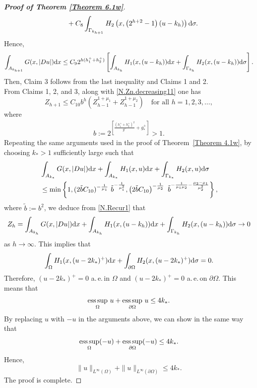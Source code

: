 \documentclass[10pt,reqno]{amsart}
\newcommand *\w{^\wedge}
\theoremstyle{definition}
\numberwithin{equation}{section}
\begin{document}
\begin{proof}[\textbf{Proof of Theorem \ref{Theorem 6.1w}}]
\begin{align*}
		&\qquad +C_8\int_{\Gamma_{k_{h+1}}}H_2\left(x,\left(2^{h+2}-1\right)(u-k_{h})\right){\rm d} \sigma.
	\end{align*}
	Hence,
	\begin{equation*}
		\int_{A_{k_{h+1}}}G(x,|D u|){\rm d}x
		\leq C_92^{h(h_1^++h_2^+)}\left[\int_{A_{k_{h}}}H_1(x,(u-k_{h})){\rm d}x+\int_{\Gamma_{k_h}}H_2(x,(u-k_{h}) ){\rm d}\sigma\right].
	\end{equation*}
	Then, Claim 3 follows from the last inequality and Claims 1 and 2.\\
	From Claims 1, 2, and 3, along with \eqref{N.Zn.decreasing11} one has
	\begin{equation}\label{N.Recur1}
		Z_{h+1}\leq C_{10} b^h\left(Z_{h-1}^{1+\mu_1}+Z_{h-1}^{1+\mu_2}\right)\quad \text{for all } h=1,2,3,\ldots,
	\end{equation}
	where
	\begin{align*}
		b:=2^{\left[\frac{\left(h_1^++h_2^+\right)^2}{g^-}+g_*^+\right]}>1.
	\end{align*}
	Repeating the same arguments used in the proof of Theorem~\ref{Theorem 4.1w}, by choosing \( k_* > 1 \) sufficiently large such that
	\begin{align*}
		&\int_{A_{k_*}}G(x,|D u|){\rm d}x+\int_{A_{k_*} }H_1(x,u){\rm d}x+\int_{\Gamma_{k_*} }H_2(x,u){\rm d} \sigma\\
		&\leq \min\left\{1,(2\tilde{b}C_{10})^{-\frac{1}{\mu_1}}\ \tilde{b}^{-\frac{1}{\mu_1^{2}}},\left(2\tilde{b}C_{10}\right)^{-\frac{1}{\mu_2}}\ \tilde{b}^{-\frac{1}{\mu_1\mu_2}-\frac{\mu_2-\mu_1}{\mu_2^{2}}}\right\},
	\end{align*}
	where $\tilde{b}:=b^2$, we deduce from \eqref{N.Recur1} that
	\begin{align*}
		Z_h=\int_{A_{k_{h}}}G(x,|D u|){\rm d}x+\int_{A_{k_{h}} }H_1(x,(u-k_{h})){\rm d}x+\int_{\Gamma_{k_{h}} }H_2(x,(u-k_{h})){\rm d} \sigma\to 0
	\end{align*}
	as $h\to \infty$. This implies that
	\begin{align*}
		\int_{\Omega}H_1(x,(u-2k_*)^+) {\rm d}x+\int_{\partial\Omega}H_2(x,(u-2k_*)^+) {\rm d} \sigma=0.
	\end{align*}
	Therefore, $(u-2k_*)^{+}=0$ a.\,e.\,in $\Omega$ and $(u-2k_*)^{+}=0$ a.\,e.\,on $\partial\Omega$. This means that
	\begin{align*}
		\underset{\Omega}{\mathop{\rm ess\,sup}}\ u +\underset{\partial\Omega}{\mathop{\rm ess\,sup}}\ u\leq 4k_*.
	\end{align*}
By replacing \( u \) with \( -u \) in the arguments above, we can show in the same way that
\[
\underset{\Omega}{\mathop{\rm ess\,sup}} (-u) + \underset{\partial\Omega}{\mathop{\rm ess\,sup}} (-u) \leq 4k_*.
\]
Hence,
\[
\|u\|_{L^\infty(\Omega)} + \|u\|_{L^\infty(\partial\Omega)} \leq 4k_*.
\]
The proof is complete.
\end{proof}
\end{document}
